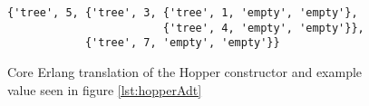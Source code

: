 \begin{figure}[!htb]
\centering
\begin{lstlisting} 
{'tree', 5, {'tree', 3, {'tree', 1, 'empty', 'empty'},
                        {'tree', 4, 'empty', 'empty'}},
            {'tree', 7, 'empty', 'empty'}}
\end{lstlisting}
\caption[Core Erlang translation of constructor and example value]
 {Core Erlang translation of the Hopper constructor and example value seen in figure \ref{lst:hopperAdt}}
\label{lst:coreAdt}
\end{figure}







